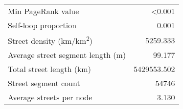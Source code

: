 \begin{table*}[htbp]
\begin{tabular}{ l r }
		Min PageRank value                               & \textless0.001 \\
		Self-loop proportion                             & 0.001        \\
		Street density (km/km\textsuperscript{2})        & 5259.333        \\
		Average street segment length (m)                & 99.177        \\
		Total street length (km)                         & 5429553.502     \\
		Street segment count                             & 54746      \\
		Average streets per node                         & 3.130         \\
		\bottomrule
	\end{tabular}
\end{table*}

